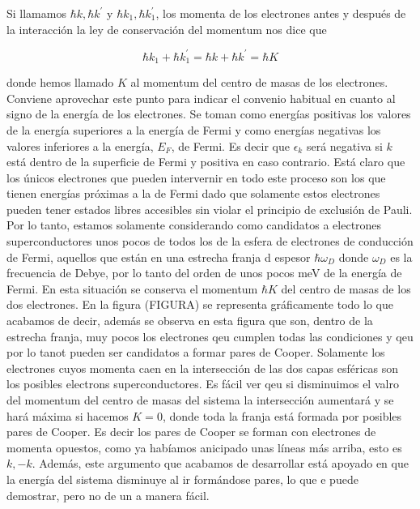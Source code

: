 
Si llamamos $\hbar k, \hbar k^\prime$ y $\hbar k_1, \hbar k_1^\prime$, los momenta de los electrones antes y después de la interacción la ley de conservación del momentum nos dice que

\begin{equation*}
    \hbar k_1 + \hbar k_1^\prime = \hbar k + \hbar k^\prime = \hbar K
\end{equation*}

donde hemos llamado $K$ al momentum del centro de masas de los electrones. Conviene aprovechar este punto para indicar el convenio habitual en cuanto al signo de la energía de los electrones. Se toman como energías positivas los valores de la energía superiores a la energía de Fermi y como energías negativas los valores inferiores a la energía, $E_F$, de Fermi. Es decir que $\epsilon_k$ será negativa si $k$ está dentro de la superficie de Fermi y positiva en caso contrario. Está claro que los únicos electrones que pueden intervernir en todo este proceso son los que tienen energías próximas a la de Fermi dado que solamente estos electrones pueden tener estados libres accesibles sin violar el principio de exclusión de Pauli. Por lo tanto, estamos solamente considerando como candidatos a electrones superconductores unos pocos de todos los de la esfera de electrones de conducción de Fermi, aquellos que están en una estrecha franja d espesor $\hbar \omega_D$ donde $\omega_D$ es la frecuencia de Debye, por lo tanto del orden de unos pocos meV de la energía de Fermi. En esta situación se conserva el momentum $\hbar K$ del centro de masas de los dos electrones. En la figura (FIGURA) se representa gráficamente todo lo que acabamos de decir, además se observa en esta figura que son, dentro de la estrecha franja, muy pocos los electrones qeu cumplen todas las condiciones y qeu por lo tanot pueden ser candidatos a formar pares de Cooper. Solamente los electrones cuyos momenta caen en la intersección de las dos capas esféricas son los posibles electrons superconductores. Es fácil ver qeu si disminuimos el valro del momentum del centro de masas del sistema la intersección aumentará y se hará máxima si hacemos $K = 0$, donde toda la franja está formada por posibles pares de Cooper. Es decir los pares de Cooper se forman con electrones de momenta opuestos, como ya habíamos anicipado unas líneas más arriba, esto es $k, -k$.  Además, este argumento que acabamos de desarrollar está apoyado en que la energía del sistema disminuye al ir formándose pares, lo que e puede demostrar, pero no de un a manera fácil.

